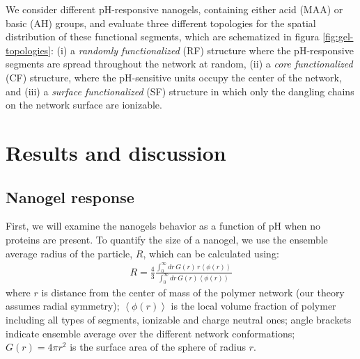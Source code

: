 We consider different pH-responsive nanogels, containing either acid (MAA) or basic (AH) groups, and evaluate three different topologies for the spatial distribution of these functional  segments, which are schematized in figura \ref{fig:gel-topologies}: 
(i) a \emph{randomly functionalized} (RF) structure where the pH-responsive segments are spread throughout the network  at random,
(ii) a \emph{core functionalized} (CF) structure, where the  pH-sensitive units occupy the center of the network, and 
(iii) a \emph{surface functionalized} (SF) structure in which only the dangling chains on the network surface  are ionizable. 

 
 
  







\section{Results and discussion}






\subsection{Nanogel response}

First, we will examine the nanogels behavior as a function of pH when no proteins are present.
To  quantify the size of a nanogel, we use the ensemble average radius of the particle, $R$, which can be calculated using:
\begin{align}
    R= \frac{4}{3}\frac{\int_0^\infty{dr\,G(r)\,r \left<\phi(r)\right>}}{\int_0^\infty{dr\,G(r)\left<\phi(r)\right>}}
\end{align}
where $r$ is distance from the center of mass of the polymer network (our theory assumes radial symmetry);
$\left<\phi(r)\right>$ is the local volume fraction of  polymer including all types of segments, ionizable and charge neutral ones;
angle brackets indicate ensemble average over the different network conformations;
$G(r)=4\pi r^2$ is the surface area of the sphere of radius $r$.





